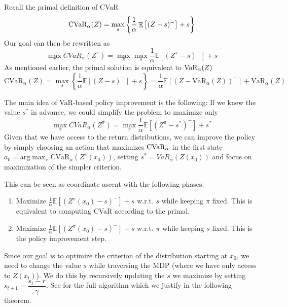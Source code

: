 Recall the primal definition of CVaR 
\begin{equation*}
\text{CVaR}_\alpha(Z)=
\max_s\left\lbrace \dfrac{1}{\alpha}\mathop{\mathbb{E}}
\left[ (Z-s)^-\right] + s  \right\rbrace 
\end{equation*}
Our goal  can then be rewritten as
\begin{equation*}
\max_\pi CVaR_\alpha(Z^\pi) = \max_\pi \max_s \dfrac{1}{\alpha}\mathbb{E}
\left[ (Z^\pi-s)^-\right] + s
\end{equation*}
As mentioned earlier, the primal solution is equivalent to $\text{VaR}_\alpha(Z)$
\begin{equation*}
\text{CVaR}_\alpha(Z)=
\max_s\left\lbrace \dfrac{1}{\alpha}\mathbb{E}
\left[ (Z-s)^-\right] + s  \right\rbrace =\dfrac{1}{\alpha}\mathbb{E}
\left[ (Z - \text{VaR}_\alpha(Z))^-\right] + \text{VaR}_\alpha(Z) 
\end{equation*}

The main idea of VaR-based policy improvement is the following: If we knew the value $s^*$ in advance, we could simplify the problem to maximize only
\begin{equation}\label{eqn:varbasedgoal}
\max_\pi CVaR_\alpha(Z^\pi) = \max_\pi \dfrac{1}{\alpha}\mathbb{E}
\left[ (Z^\pi-s^*)^-\right] + s^*
\end{equation}
Given that we have access to the return distributions, we can improve the policy by simply choosing an action that maximizes $\text{CVaR}_\alpha$ in the first state $a_0 = \text{arg}\max_\pi\text{CVaR}_\alpha(Z^\pi(x_0))$, setting $s^* = VaR_\alpha(Z(x_0))$ and focus on maximization of the simpler criterion.

This can be seen as coordinate ascent with the following phases:
\begin{enumerate}
\item Maximize $\frac{1}{\alpha}\mathbb{E}\left[ (Z^\pi(x_0)-s)^-\right] + s$ w.r.t. $s$ while keeping $\pi$ fixed. This is equivalent to computing CVaR according to the primal.
\item Maximize $\frac{1}{\alpha}\mathbb{E}\left[ (Z^\pi(x_0)-s)^-\right] + s$ w.r.t. $\pi$ while keeping $s$ fixed. This is the policy improvement step.
\end{enumerate}
Since our goal is to optimize the criterion of the distribution starting at $x_0$, we need to change the value $s$ while traversing the MDP (where we have only access to $Z(x_t)$). We do this by recursively updating the $s$ we maximize by setting $s_{t+1} = \dfrac{s_t - r}{\gamma}$. See  for the full algorithm which we justify in the following theorem.

